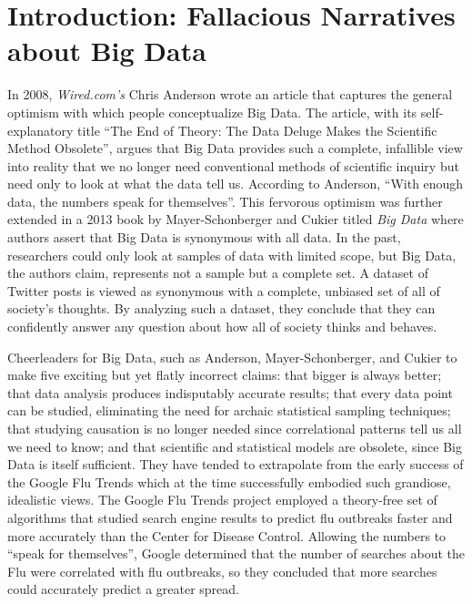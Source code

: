 \documentclass[sigconf]{acmart}
\begin{document}

\maketitle

\section{Introduction: Fallacious Narratives about Big Data}

In 2008, {\em Wired.com's} Chris Anderson wrote an article that captures the general optimism with which people conceptualize Big Data. The article, with its self-explanatory title ``The End of Theory: The Data Deluge Makes the Scientific Method Obsolete'', argues that Big Data provides such a complete, infallible view into reality that we no longer need conventional methods of scientific inquiry but need only to look at what the data tell us. According to Anderson, ``With enough data, the numbers speak for themselves''\cite{Anderson2008}. This fervorous optimism was further extended in a 2013 book by Mayer-Schonberger and Cukier titled {\em Big Data} where authors assert that Big Data is synonymous with all data. In the past, researchers could only look at samples of data with limited scope, but Big Data, the authors claim, represents not a sample but a complete set\cite{Lagoze2014}. A dataset of Twitter posts is viewed as synonymous with a complete, unbiased set of all of society's thoughts. By analyzing such a dataset, they conclude that they can confidently answer any question about how all of society thinks and behaves\cite{Harford2014}.

Cheerleaders for Big Data, such as Anderson, Mayer-Schonberger, and Cukier to make five exciting but yet flatly incorrect claims: that bigger is always better; that data analysis produces indisputably accurate results; that every data point can be studied, eliminating the need for archaic statistical sampling techniques; that studying causation is no longer needed since correlational patterns tell us all we need to know; and that scientific and statistical models are obsolete, since Big Data is itself sufficient. They have tended to extrapolate from the early success of the Google Flu Trends which at the time successfully embodied such grandiose, idealistic views. The Google Flu Trends project employed a theory-free set of algorithms that studied search engine results to predict flu outbreaks faster and more accurately than the Center for Disease Control. Allowing the numbers to ``speak for themselves'', Google determined that the number of searches about the Flu were correlated with flu outbreaks, so they concluded that more searches could accurately predict a greater spread\cite{Harford2014}. 
\end{document}
